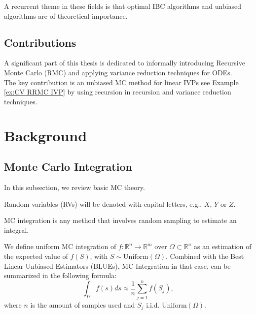 \documentclass[a4paper,12pt]{article}
\begin{document}
A recurrent theme in these fields is that optimal IBC
algorithms and unbiased algorithms
are of theoretical importance.

\subsection{Contributions}

A significant part of this thesis is dedicated to
informally introducing Recursive Monte Carlo (RMC)
and applying variance reduction techniques for ODEs. \\

The key contribution is an unbiased MC method
for linear IVPs see Example \ref{ex:CV RRMC IVP}
by using recursion in recursion
and variance reduction techniques.

\section{Background}

\subsection{Monte Carlo Integration}

In this subsection, we review basic MC theory. \\

\begin{notation}
  Random variables (RVs) will be denoted with capital letters, e.g., $X$, $Y$ or $Z$.
\end{notation}


MC integration is any method that involves random sampling to
estimate an integral.
\begin{definition}
  We define uniform MC integration of
  $f:\mathbb{R}^{n} \rightarrow \mathbb{R}^{m}$
  over $\Omega \subset \mathbb{R}^{n}$ as
  an estimation of the expected value of $f(S)$, with
  $S \sim \text{Uniform}(\Omega)$. Combined
  with the Best Linear Unbiased Estimators (BLUEs), MC Integration
  in that case, can be summarized in the following formula:
  \begin{equation}\label{eq:BLUE}
    \int_{\Omega} f(s)ds \approx \frac{1}{n} \sum_{j=1}^{n}f(S_{j}),
  \end{equation}
  where $n$ is the amount of samples used and $S_{j}$ i.i.d. $\text{Uniform}(\Omega)$.
\end{definition}
\end{document}
